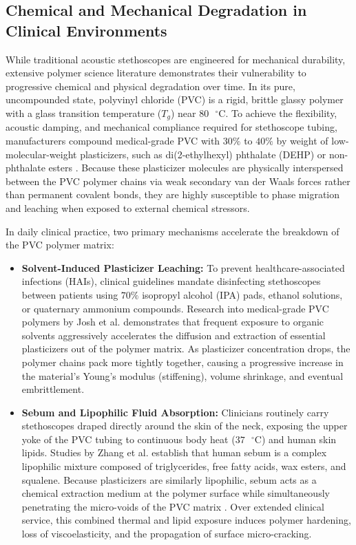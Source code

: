 \subsection{Chemical and Mechanical Degradation in Clinical Environments}

While traditional acoustic stethoscopes are engineered for mechanical durability, extensive polymer science literature demonstrates their vulnerability to progressive chemical and physical degradation over time. In its pure, uncompounded state, polyvinyl chloride (PVC) is a rigid, brittle glassy polymer with a glass transition temperature ($T_g$) near $80\text{ }^\circ\text{C}$. To achieve the flexibility, acoustic damping, and mechanical compliance required for stethoscope tubing, manufacturers compound medical-grade PVC with $30\%$ to $40\%$ by weight of low-molecular-weight plasticizers, such as di(2-ethylhexyl) phthalate (DEHP) or non-phthalate esters \cite{josh2012temperature}. Because these plasticizer molecules are physically interspersed between the PVC polymer chains via weak secondary van der Waals forces rather than permanent covalent bonds, they are highly susceptible to phase migration and leaching when exposed to external chemical stressors.

In daily clinical practice, two primary mechanisms accelerate the breakdown of the PVC polymer matrix:
\begin{itemize}
    \item \textbf{Solvent-Induced Plasticizer Leaching:} To prevent healthcare-associated infections (HAIs), clinical guidelines mandate disinfecting stethoscopes between patients using $70\%$ isopropyl alcohol (IPA) pads, ethanol solutions, or quaternary ammonium compounds. Research into medical-grade PVC polymers by Josh et al. \cite{josh2012temperature} demonstrates that frequent exposure to organic solvents aggressively accelerates the diffusion and extraction of essential plasticizers out of the polymer matrix. As plasticizer concentration drops, the polymer chains pack more tightly together, causing a progressive increase in the material's Young's modulus (stiffening), volume shrinkage, and eventual embrittlement.
    \item \textbf{Sebum and Lipophilic Fluid Absorption:} Clinicians routinely carry stethoscopes draped directly around the skin of the neck, exposing the upper yoke of the PVC tubing to continuous body heat ($37\text{ }^\circ\text{C}$) and human skin lipids. Studies by Zhang et al. \cite{zhang2024review} establish that human sebum is a complex lipophilic mixture composed of triglycerides, free fatty acids, wax esters, and squalene. Because plasticizers are similarly lipophilic, sebum acts as a chemical extraction medium at the polymer surface while simultaneously penetrating the micro-voids of the PVC matrix \cite{zhang2024review}. Over extended clinical service, this combined thermal and lipid exposure induces polymer hardening, loss of viscoelasticity, and the propagation of surface micro-cracking.
\end{itemize}

